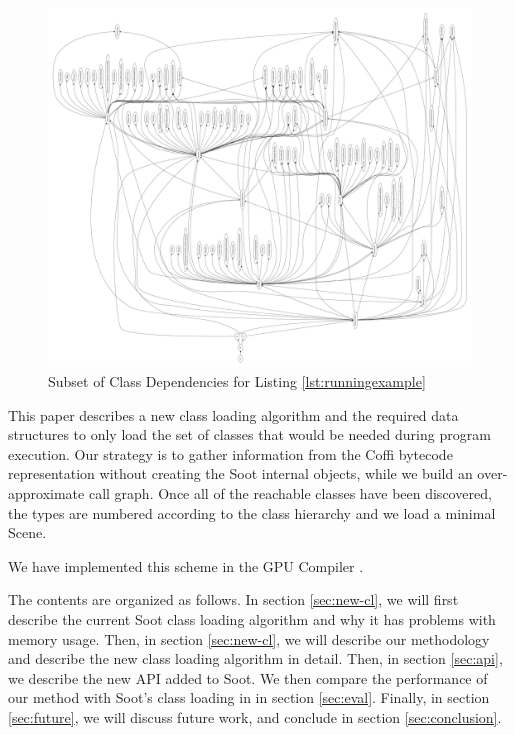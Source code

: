 \documentclass[preprint]{sigplanconf}
\begin{document}
\begin{figure}

\includegraphics[scale=0.08,angle=-90]{class-dependency-small.pdf} 

\caption{Subset of Class Dependencies for Listing \ref{lst:runningexample}}
\label{fig:deps}
\end{figure}
This paper describes a new class loading algorithm and the required data structures to only load the set of classes that would be needed during program execution. Our strategy is to gather information from the Coffi bytecode representation without creating the Soot internal objects, while we build an over-approximate call graph. Once all of the reachable classes have been discovered, the types are numbered according to the class hierarchy and we load a minimal Scene.

We have implemented this scheme in the \rb GPU Compiler \cite{rootbeer}. 

The contents are organized as follows. In section \ref{sec:new-cl}, we will first describe the current Soot class loading algorithm and why it has problems with memory usage. Then, in section \ref{sec:new-cl}, we will describe our methodology and describe the new class loading algorithm in detail. Then, in section \ref{sec:api}, we describe the new API added to Soot. We then compare the performance of our method with Soot's class loading in \rb in section \ref{sec:eval}. Finally, in section \ref{sec:future}, we will discuss future work, and conclude in section \ref{sec:conclusion}.
\end{document}
